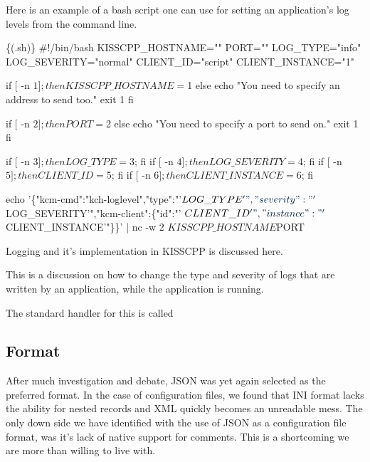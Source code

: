 Here is an example of a bash script one can use for setting an application's log levels from the command line.


\begin{DoxyCode}
\{(.sh)\}
#!/bin/bash
KISSCPP\_HOSTNAME=\textcolor{stringliteral}{""}
PORT=\textcolor{stringliteral}{""}
LOG\_TYPE=\textcolor{stringliteral}{"info"}
LOG\_SEVERITY=\textcolor{stringliteral}{"normal"}
CLIENT\_ID=\textcolor{stringliteral}{"script"}
CLIENT\_INSTANCE=\textcolor{stringliteral}{"1"}

\textcolor{keywordflow}{if} [ -n $1 ]; then
  KISSCPP\_HOSTNAME=$1
\textcolor{keywordflow}{else}
  echo \textcolor{stringliteral}{"You need to specify an address to send too."}
  exit 1
fi

\textcolor{keywordflow}{if} [ -n $2 ]; then
  PORT=$2
\textcolor{keywordflow}{else}
  echo \textcolor{stringliteral}{"You need to specify a port to send on."}
  exit 1
fi

\textcolor{keywordflow}{if} [ -n $3 ]; then LOG\_TYPE=$3;        fi
\textcolor{keywordflow}{if} [ -n $4 ]; then LOG\_SEVERITY=$4;    fi
\textcolor{keywordflow}{if} [ -n $5 ]; then CLIENT\_ID=$5;       fi
\textcolor{keywordflow}{if} [ -n $6 ]; then CLIENT\_INSTANCE=$6; fi

echo \textcolor{stringliteral}{'\{"kcm-cmd":"kch-loglevel","type":"'}$LOG\_TYPE\textcolor{stringliteral}{'","severity":"'}$LOG\_SEVERITY\textcolor{stringliteral}{'","kcm-client":\{"id":"'}
      $CLIENT\_ID\textcolor{stringliteral}{'","instance":"'}$CLIENT\_INSTANCE\textcolor{stringliteral}{'"\}\}'} | nc -w 2 $KISSCPP\_HOSTNAME $PORT
\end{DoxyCode}


Logging and it's implementation in K\-I\-S\-S\-C\-P\-P is discussed here.

This is a discussion on how to change the type and severity of logs that are written by an application, while the application is running.

The standard handler for this is called

\subsection*{Format}

After much investigation and debate, J\-S\-O\-N was yet again selected as the preferred format. In the case of configuration files, we found that I\-N\-I format lacks the ability for nested records and X\-M\-L quickly becomes an unreadable mess. The only down side we have identified with the use of J\-S\-O\-N as a configuration file format, was it's lack of native support for comments. This is a shortcoming we are more than willing to live with.

